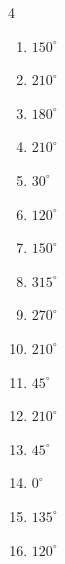 \begin{multicols}{4}
\begin{enumerate}
  \item $\displaystyle 150^{\circ}$

  \item $\displaystyle 210^{\circ}$

  \item $\displaystyle 180^{\circ}$
        \phantom{$\displaystyle =\pi$}

  \item $\displaystyle 210^{\circ}$

  \item $\displaystyle 30^{\circ}$

  \item $\displaystyle 120^{\circ}$

  \item $\displaystyle 150^{\circ}$

  \item $\displaystyle 315^{\circ}$

  \item $\displaystyle 270^{\circ}$

  \item $\displaystyle 210^{\circ}$

\columnbreak %

  \item $\displaystyle 45^{\circ}$

  \item $\displaystyle 210^{\circ}$

  \item $\displaystyle 45^{\circ}$

  \item $\displaystyle 0^{\circ}$
        \phantom{$\displaystyle =0$}

  \item $\displaystyle 135^{\circ}$

  \item $\displaystyle 120^{\circ}$


\end{enumerate}
\end{multicols}
